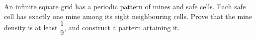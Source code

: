 An infinite square grid has a periodic pattern of mines and safe cells. Each safe cell has exactly one mine among its eight neighbouring cells. Prove that the mine density is at least $\dfrac{1}{9}$, and construct a pattern attaining it.
